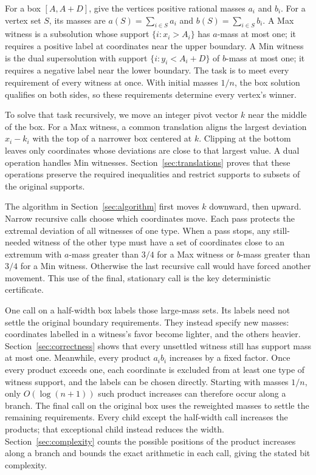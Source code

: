 For a box $[A,A+D]$, give the vertices positive rational masses
$a_i$ and $b_i$. For a vertex set $S$, its masses are
$a(S)=\sum_{i\in S}a_i$ and $b(S)=\sum_{i\in S}b_i$. A Max witness is a subsolution whose support
$\{i:x_i>A_i\}$ has $a$-mass at most one; it requires a positive
label at coordinates near the upper boundary. A Min witness is the
dual supersolution with support $\{i:y_i<A_i+D\}$ of $b$-mass
at most one; it requires a negative label near the lower boundary.
The task is to meet every requirement of every witness at once. With
initial masses $1/n$, the box solution qualifies on both sides, so
these requirements determine every vertex's winner.

To solve that task recursively, we move an integer pivot vector $k$
near the middle of the box. For a Max witness, a common translation
aligns the largest deviation $x_i-k_i$ with the top of a narrower
box centered at $k$. Clipping at the bottom leaves only coordinates
whose deviations are close to that largest value. A dual operation
handles Min witnesses. Section~\ref{sec:translations} proves that
these operations preserve the required inequalities and restrict
supports to subsets of the original supports.

The algorithm in Section~\ref{sec:algorithm} first moves $k$
downward, then upward. Narrow recursive calls choose which
coordinates move. Each pass protects the extremal deviation of all
witnesses of one type. When a pass stops, any still-needed witness
of the other type must have a set of coordinates close to an extremum
with $a$-mass greater than $3/4$ for a Max witness or $b$-mass
greater than $3/4$ for a Min witness. Otherwise the last recursive call would have
forced another movement. This use of the final, stationary call is
the key deterministic certificate.

One call on a half-width box labels those large-mass sets. Its labels
need not settle the original boundary requirements. They instead
specify new masses: coordinates labelled in a witness's favor become
lighter, and the others heavier. Section~\ref{sec:correctness}
shows that every unsettled witness still has support mass at most
one. Meanwhile, every product $a_i b_i$ increases by a fixed factor.
Once every product exceeds one, each coordinate is excluded from
at least one type of witness support, and the labels can be chosen
directly. Starting with masses $1/n$, only $O(\log(n+1))$ such
product increases can therefore occur along a branch. The final call
on the original box uses the reweighted masses to settle the remaining
requirements. Every child except the half-width call increases the
products; that exceptional child instead reduces the width.
Section~\ref{sec:complexity} counts the possible positions of the
product increases along a branch and bounds the exact arithmetic in
each call, giving the stated bit complexity.

